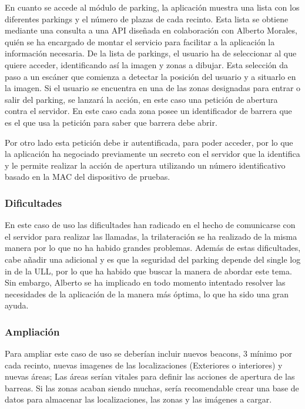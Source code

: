 En cuanto se accede al módulo de parking, la aplicación muestra una lista con los diferentes parkings y el número de plazas de cada recinto. Esta lista se obtiene mediante una consulta a una API diseñada en colaboración con Alberto Morales, quién se ha encargado de montar el servicio para facilitar a la aplicación la información necesaria. De la lista de parkings, el usuario ha de seleccionar al que quiere acceder, identificando así la imagen y zonas a dibujar. Esta selección da paso a un escáner que comienza a detectar la posición del usuario y a situarlo en la imagen. Si el usuario se encuentra en una de las zonas designadas para entrar o salir del parking, se lanzará la acción, en este caso una petición de abertura contra el servidor. En este caso cada zona posee un identificador de barrera que es el que usa la petición para saber que barrera debe abrir. 


Por otro lado esta petición debe ir autentificada, para poder acceder, por lo que la aplicación ha negociado previamente un secreto con el servidor que la identifica y le permite realizar la acción de apertura utilizando un número identificativo basado en la MAC del dispositivo de pruebas.


\subsubsection{Dificultades}

En este caso de uso las dificultades han radicado en el hecho de comunicarse con el servidor para realizar las llamadas, la trilateración se ha realizado de la misma manera por lo que no ha habido grandes problemas. Además de estas dificultades, cabe añadir una adicional y es que la seguridad del parking depende del single log in de la ULL, por lo que ha habido que buscar la manera de abordar este tema. Sin embargo, Alberto se ha implicado en todo momento intentado resolver las necesidades de la aplicación de la manera más óptima, lo que ha sido una gran ayuda.

\subsubsection{Ampliación}

Para ampliar este caso de uso se deberían incluir nuevos beacons, 3 mínimo por cada recinto, nuevas imagenes de las localizaciones (Exteriores o interiores) y nuevas áreas; Las áreas serían vitales para definir las acciones de apertura de las barreas. Si las zonas acaban siendo muchas, sería recomendable crear una base de datos  para almacenar las localizaciones, las zonas y las imágenes a cargar.

